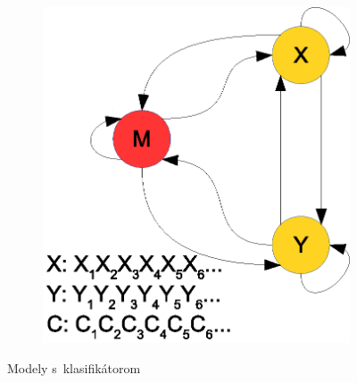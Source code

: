 \documentclass{svk_short_sk}
\begin{document}
\begin{figure}[H]
\begin{subfigure}[b]{0.17\textwidth}
                \includegraphics[width=\textwidth, clip=true]{images/model_clf_paska}
                \caption{}
                \label{fig:model-clf-tape}
        \end{subfigure}
        \caption{Modely s~klasifikátorom}
\end{figure}
\vspace{-1cm}



\end{document}
